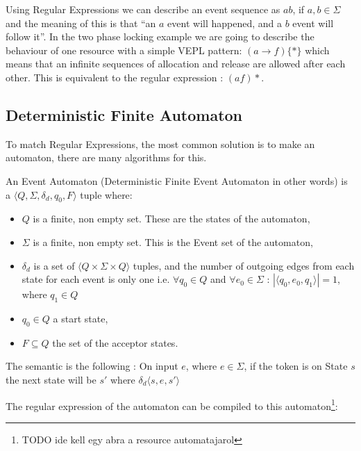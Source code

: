 		Using Regular Expressions we can describe an event sequence as $ab$, if $a,b \in \Sigma$ and the meaning of this is that ``an $a$ event will happened,
		and a $b$ event will follow it''. In the two phase locking example we are going to describe the behaviour of one resource with a simple VEPL pattern:
		$(a \rightarrow f)\{\ast\}$ which means that an infinite sequences of allocation and release are allowed after each other. This is equivalent to the 
		regular expression : $(af)\ast$.
		
		
		
		\subsection{Deterministic Finite Automaton}
			To match Regular Expressions, the most common solution is to make an automaton, there are many algorithms for this.  %
			
			
			\begin{dfn}
				\label{dfn:cep:dfea}
				An Event Automaton (Deterministic Finite Event Automaton in other words) is a $\langle Q,\Sigma,\delta_d,q_0, F \rangle$ tuple where: 
					\begin{itemize}
						\item $Q$ is a finite, non empty set. These are the states of the automaton,
						\item $\Sigma$ is a finite, non empty set. This is the Event set of the automaton,
						\item $\delta_d$ is a set of $\langle Q \times \Sigma \times Q \rangle$ tuples,
							and the number of outgoing edges from each state for each event is only one 
							i.e. $\forall q_0 \in Q$ and $\forall e_0 \in \Sigma$ : $|\langle q_0, e_0, q_1 \rangle| = 1$, where $q_1 \in Q$ 
						\item $q_0 \in Q$ a start state,
						\item $F \subseteq Q$ the set of the acceptor states.
					\end{itemize}	
			\end{dfn}

			The semantic is the following : 
			On input $e$, where $e \in \Sigma$, if the token is on State $s$ the next state will be $s'$ where %
			$\delta_d \langle s,e,s' \rangle$ 
			
			The regular expression of the automaton can be compiled to this automaton\footnote{TODO ide kell egy abra a resource automatajarol}:
			
